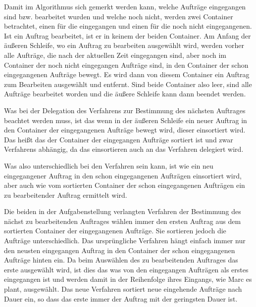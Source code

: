 \documentclass[a4paper,10pt,ngerman]{scrartcl}
\begin{document}
Damit im Algorithmus sich gemerkt werden kann,
welche Aufträge eingegangen sind bzw. bearbeitet wurden
und welche noch nicht, werden zwei Container betrachtet,
einen für die eingegangen und einen für die noch nicht eingegangenen.
Ist ein Auftrag bearbeitet, ist er in keinem der beiden Container.
Am Anfang der äußeren Schleife, wo ein Auftrag zu bearbeiten ausgewählt wird,
werden vorher alle Aufträge,
die nach der aktuellen Zeit eingegangen sind,
aber noch im Container der noch nicht eingegangen Aufträge sind,
in den Container der schon eingegangenen Aufträge bewegt.
Es wird dann von diesem Container ein Auftrag zum Bearbeiten ausgewählt und entfernt.
Sind beide Container also leer, sind alle Aufträge bearbeitet worden
und die äußere Schleife kann dann beendet werden.

Was bei der Delegation des Verfahrens zur Bestimmung des nächsten Auftrages beachtet werden muss,
ist das wenn in der äußeren Schleife ein neuer Auftrag in den Container der eingegangenen Aufträge bewegt wird,
dieser einsortiert wird. Das heißt das der Container der eingegangen Aufträge sortiert ist
und zwar Verfahrens abhängig,
da das einsortieren auch an das Verfahren delegiert wird.

Was also unterschiedlich bei den Verfahren sein kann, ist wie ein neu eingegangener Auftrag
in den schon eingegangenen Aufträgen einsortiert wird,
aber auch wie vom sortierten Container der schon eingegangenen Aufträgen
ein zu bearbeitender Auftrag ermittelt wird.

Die beiden in der Aufgabenstellung verlangten Verfahren der Bestimmung
des nächst zu bearbeitenden Auftrages wählen immer den ersten Auftrag
aus dem sortierten Container der eingegangenen Aufträge.
Sie sortieren jedoch die Aufträge unterschiedlich.
Das ursprüngliche Verfahren hängt einfach immer nur den neusten eingegangen Auftrag
in den Container der schon eingegangenen Aufträge hinten ein.
Da beim Auswählen des zu bearbeitenden Auftrages das erste ausgewählt wird,
ist dies das was von den eingegangen Aufträgen als erstes eingegangen ist
und werden damit in der Reihenfolge ihres Eingangs, wie Marc es plant, ausgewählt.
Das neue Verfahren sortiert neue eingehende Aufträge nach Dauer ein,
so dass das erste immer der Auftrag mit der geringsten Dauer ist.
\end{document}
